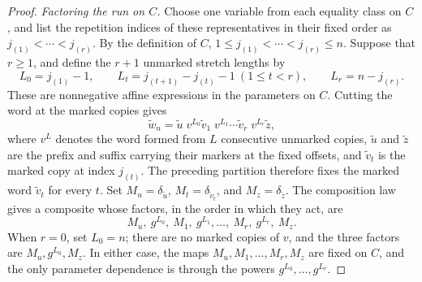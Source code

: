 \documentclass[11pt]{article}
\theoremstyle{definition}
\begin{document}
\begin{proof}
\vspace{0.5em}
\noindent\emph{Factoring the run on $C$.}
Choose one variable from each equality class on $C$, and list the repetition
indices of these representatives in their fixed order as
$j_{(1)}<\cdots<j_{(r)}$.  By the definition of $C$,
$1\le j_{(1)}<\cdots<j_{(r)}\le n$.  Suppose that $r\ge1$, and define the
$r+1$ unmarked stretch lengths by
\[
   L_0=j_{(1)}-1,\qquad
   L_t=j_{(t+1)}-j_{(t)}-1\ (1\le t<r),\qquad
   L_r=n-j_{(r)}.
\]
These are nonnegative affine expressions in the parameters on $C$.  Cutting the
word at the marked copies gives
\[
   \widetilde w_n=
   \widetilde u\;v^{L_0}\widetilde v_1\;v^{L_1}\cdots
   \widetilde v_r\;v^{L_r}\widetilde z,
\]
where $v^{L}$ denotes the word formed from $L$ consecutive unmarked copies,
$\widetilde u$ and $\widetilde z$ are the prefix and suffix carrying their
markers at the fixed offsets, and $\widetilde v_t$ is the marked copy at index
$j_{(t)}$.  The preceding partition therefore fixes the marked word
$\widetilde v_t$ for every $t$.  Set $M_u=\delta_{\widetilde u}$,
$M_t=\delta_{\widetilde v_t}$, and $M_z=\delta_{\widetilde z}$.  The
composition law gives a composite whose factors, in the order
in which they act, are
\[
   M_u,\ g^{L_0},\ M_1,\ g^{L_1},\ldots,\ M_r,\ g^{L_r},\ M_z.
\]
When $r=0$, set $L_0=n$; there are no marked copies of $v$, and the three
factors are $M_u,g^{L_0},M_z$.  In either case, the maps
$M_u,M_1,\ldots,M_r,M_z$ are fixed on $C$, and the only parameter dependence is
through the powers $g^{L_0},\ldots,g^{L_r}$.


\end{proof}
\end{document}
